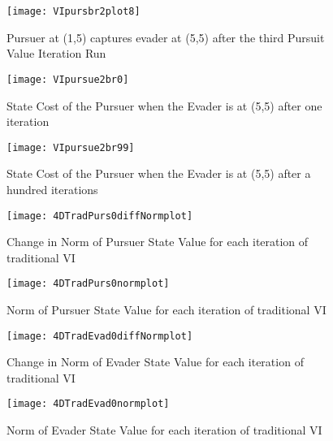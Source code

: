 \begin{figure}
\vspace{2.4in}
\centering
\texttt{[image: VIpursbr2plot8]}
\caption{Pursuer at (1,5) captures evader at (5,5) after the third Pursuit Value Iteration Run}
\label{VIpursbr2plot8}
\end{figure}
\clearpage
\newpage

\begin{figure}
\vspace{2.4in}
\centering
\texttt{[image: VIpursue2br0]}
\caption{State Cost of the Pursuer when the Evader is at (5,5) after one iteration}
\label{VIpursue2br0}
\end{figure}
\clearpage
\newpage

\begin{figure}
\vspace{2.4in}
\centering
\texttt{[image: VIpursue2br99]}
\caption{State Cost of the Pursuer when the Evader is at (5,5) after a hundred iterations}
\label{VIpursue2br99}
\end{figure}
\clearpage
\newpage

\begin{figure}
\vspace{2.4in}
\centering
\texttt{[image: 4DTradPurs0diffNormplot]}
\caption{Change in Norm of Pursuer State Value for each iteration of traditional VI}
\label{4DTradPurs0diffNormplot}
\end{figure}
\clearpage
\newpage

\begin{figure}
\vspace{2.4in}
\centering
\texttt{[image: 4DTradPurs0normplot]}
\caption{Norm of Pursuer State Value for each iteration of traditional VI}
\label{4DTradPurs0normplot}
\end{figure}
\clearpage
\newpage

\begin{figure}
\vspace{2.4in}
\centering
\texttt{[image: 4DTradEvad0diffNormplot]}
\caption{Change in Norm of Evader State Value for each iteration of traditional VI}
\label{4DTradEvad0diffNormplot}
\end{figure}
\clearpage
\newpage

\begin{figure}
\vspace{2.4in}
\centering
\texttt{[image: 4DTradEvad0normplot]}
\caption{Norm of Evader State Value for each iteration of traditional VI}
\label{4DTradEvad0normplot}
\end{figure}
\clearpage
\newpage

